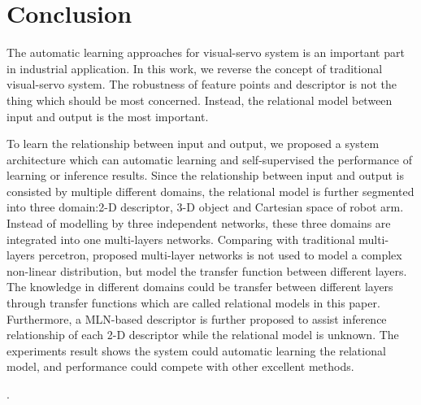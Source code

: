 \documentclass[journal]{IEEEtran}
\begin{document}
\section{Conclusion}
The automatic learning approaches for visual-servo system is an important part in industrial application. In this work, we reverse the concept of traditional visual-servo system. The robustness of feature points and descriptor is not the thing which should be most concerned. Instead, the relational model between input and output is the most important. 

To learn the relationship between input and output, we proposed a system architecture which can automatic learning and self-supervised the performance of learning or inference results. Since the relationship between input and output is consisted by multiple different domains, the relational model is further segmented into three domain:2-D descriptor, 3-D object and Cartesian space of robot arm. Instead of modelling by three independent networks, these three domains are integrated into one multi-layers networks. Comparing with traditional multi-layers percetron, proposed multi-layer networks is not used to model a complex non-linear distribution, but model the transfer function between different layers. 
The knowledge in different domains could be transfer between different layers through transfer functions which are called relational models in this paper.  Furthermore, a MLN-based descriptor is further proposed to assist inference relationship of each 2-D descriptor while the relational model is unknown. The experiments result shows the system could automatic learning the relational model, and performance could compete with other excellent methods.  





.
\ifCLASSOPTIONcaptionsoff
  \newpage
\fi
\end{document}

